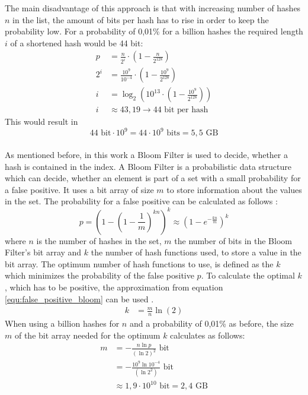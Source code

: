 The main disadvantage of this approach is that with increasing number of hashes $n$ in the list, the amount of bits per hash has to rise in order to keep the probability low.
For a probability of 0,01\% for a billion hashes the required length $i$ of a shortened hash would be 44 bit:
\begin{equation}
	\begin{split}
		p&=\frac{n}{2^i}\cdot \left(1- \frac{n}{2^{128}}\right) \\[10pt]
		2^i&=\frac{10^9}{10^{-4}}\cdot \left(1- \frac{10^9}{2^{128}}\right) \\[10pt]
		i&=\log_2\left(10^{13}\cdot \left(1- \frac{10^9}{2^{128}}\right)\right) \\[10pt]
		i&\approx 43,19 \rightarrow 44 \text{ bit per hash}
	\end{split}
\end{equation}
This would result in 
\begin{equation}
	44\text{ bit} \cdot 10^9 = 44\cdot10^9 \text{ bits} = 5,5 \text{ GB}
\end{equation}
\\
As mentioned before, in this work a Bloom Filter is used to decide, whether a hash is contained in the index.
A Bloom Filter is a probabilistic data structure which can decide, whether an element is part of a set with a small probability for a false positive.
It uses a bit array of size $m$ to store information about the values in the set.
The probability for a false positive can be calculated as follows \cite{fan2000summary}:
\begin{equation}\label{equ:false_positive_bloom}
	p=\left(1-\left(1-\frac{1}{m}\right)^{kn}\right)^k \approx \left(1-e^{-\frac{kn}{m}}\right)^k
\end{equation}
where $n$ is the number of hashes in the set, $m$ the number of bits in the Bloom Filter's bit array and $k$ the number of hash functions used, to store a value in the bit array.
The optimum number of hash functions to use, is defined as the $k$ which minimizes the probability of the false positive $p$.
To calculate the optimal $k$, which has to be positive, the approximation from equation \ref{equ:false_positive_bloom} can be used \cite{wiki2018bloom}. %
\begin{equation}
	\begin{split}
		k&=\frac{m}{n}\ln(2)
	\end{split}
\end{equation}
When using a billion hashes for $n$ and a probability of 0,01\% as before, the size $m$ of the bit array needed for the optimum $k$ calculates as follows:
\begin{equation}
	\begin{split}
		m&=-\frac{n\ln p}{(\ln2)^2} \text{ bit} \\[10pt]
		&=-\frac{10^9\ln10^{-4}}{(\ln2^2)} \text{ bit} \\[10pt]
		&\approx 1,9\cdot10^{10} \text{ bit}=2,4\text{ GB}
	\end{split}
\end{equation}

